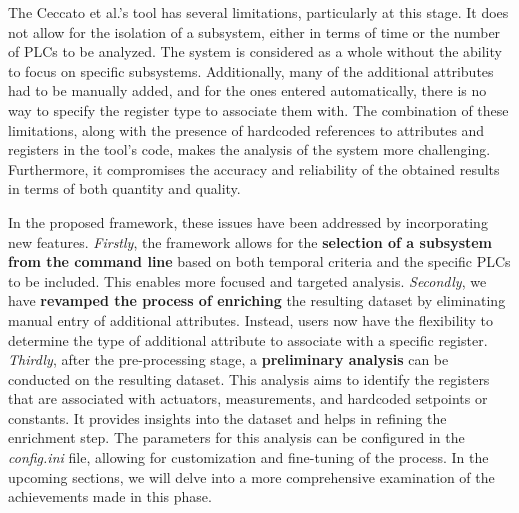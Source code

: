 \bigskip
The Ceccato et al.'s tool has several limitations, particularly at this stage. It does not allow for the isolation of a subsystem, either in terms of time or the number of PLCs to be analyzed. The system is considered as a whole without the ability to focus on specific subsystems. Additionally, many of the additional attributes had to be manually added, and for the ones entered automatically, there is no way to specify the register type to associate them with.\newline
The combination of these limitations, along with the presence of hardcoded references to attributes and registers in the tool's code, makes the analysis of the system more challenging. Furthermore, it compromises the accuracy and reliability of the obtained results in terms of both quantity and quality.

\bigskip
In the proposed framework, these issues have been addressed by incorporating new features.\newline 
\textit{Firstly}, the framework allows for the \textbf{selection of a subsystem from the command line} based on both temporal criteria and the specific PLCs to be included. This enables more focused and targeted analysis.\newline
\textit{Secondly}, we have \textbf{revamped the process of enriching} the resulting dataset by eliminating manual entry of additional attributes. Instead, users now have the flexibility to determine the type of additional attribute to associate with a specific register.\newline
\textit{Thirdly}, after the pre-processing stage, a \textbf{preliminary analysis} can be conducted on the resulting dataset. This analysis aims to identify the registers that are associated with actuators, measurements, and hardcoded setpoints or constants. It provides insights into the dataset and helps in refining the enrichment step. The parameters for this analysis can be configured in the \textit{config.ini} file, allowing for customization and fine-tuning of the process.\newline \newline 
In the upcoming sections, we will delve into a more comprehensive examination of the achievements made in this phase.

